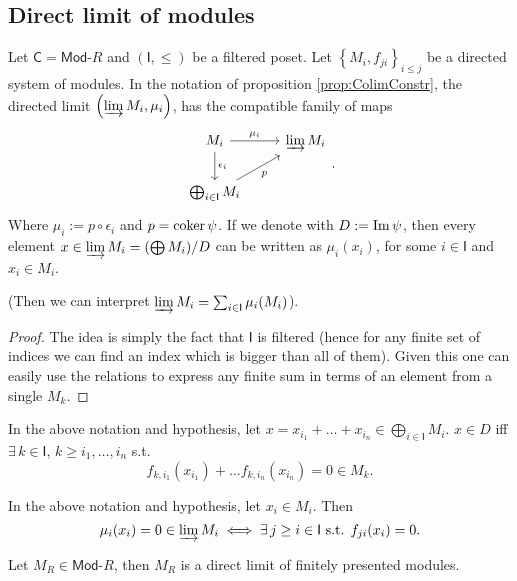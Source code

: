 \subsection{Direct limit of modules}
\begin{lem}
	Let $\mathsf{C} = \mathsf{Mod}\text{-}R$ and $\left(\mathsf{I}, \leq\right)$ be a filtered poset.
	Let $\left\{ M_i, f_{ji} \right\}_{i \leq j}$ be a directed system of modules.
	In the notation of proposition \ref{prop:ColimConstr}, the directed limit $\left(\varinjlim M_i, \mu_i\right)$, has the
	compatible family of maps
	\begin{equation}
	\begin{tikzcd}
		M_i \arrow[r, "\mu_i", rightarrow] \arrow[d, "\epsilon_i", rightarrow] &
		\varinjlim M_i \\
		\bigoplus_{i \in \mathsf{I}} M_i \arrow[ru, "p"', rightarrow] &
	\end{tikzcd}
	.\end{equation} 
	Where $\mu_i := p \circ\epsilon_i$ and $p = \operatorname{coker} \psi$.
	If we denote with $D := \operatorname{Im} \psi$, then
	every element $x \in \varinjlim M_i = (\bigoplus M_i)/D$ can be written as
	$\mu_i(x_i)$, for some $i \in \mathsf{I}$ and $x_i \in M_i$.

	(Then we can interpret $\varinjlim M_i = \sum_{i \in \mathsf{I}}^{} \mu_i (M_i)$).
\end{lem} 
\begin{proof}
	The idea is simply the fact that $\mathsf{I}$ is filtered 
	(hence for any finite set of indices we can find an index which is bigger than all of them).
	Given this one can easily use the relations to express any finite sum in terms of an element from a single $M_k$.
\end{proof}

\begin{lem}
	In the above notation and hypothesis, let $x = x_{i_1} + \ldots + x_{i_n} \in \bigoplus_{i \in \mathsf{I}} M_i$.
	$x \in D$ iff $\exists\, k \in \mathsf{I}$, $k \geq i_1, \ldots, i_n$ s.t.
	\begin{equation}
		f_{k, i_1}(x_{i_1}) + \ldots f_{k, i_n}(x_{i_n}) = 0 \in M_k
	.\end{equation} 
\end{lem} 

\begin{lem}
	In the above notation and hypothesis, let $x_i \in M_i$.
	Then 
	\begin{equation}
		\mu_i(x_i) = 0 \in \varinjlim M_i \iff \exists\, j \geq i \in \mathsf{I} \text{ s.t. } f_{ji}(x_i) = 0
	.\end{equation} 
\end{lem} 

\begin{prop}
	Let $M_R \in \mathsf{Mod}\text{-}R$, then $M_R$ is a direct limit of finitely presented modules.
\end{prop} 
